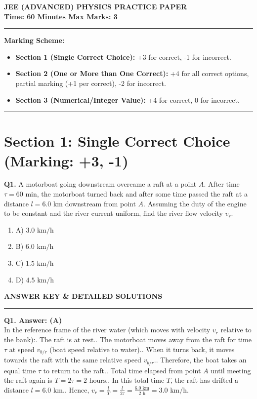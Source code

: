 \documentclass[11pt,a4paper]{article}
\begin{document}
\begin{center}
    {\LARGE \textbf{JEE (ADVANCED) PHYSICS PRACTICE PAPER}}\\[4pt]
    \textbf{Time: 60 Minutes \qquad Max Marks: 3}
    \rule{\textwidth}{1pt}
\end{center}

\vspace{0.2cm}
\noindent \textbf{Marking Scheme:}
\begin{itemize}[noitemsep]
    \item \textbf{Section 1 (Single Correct Choice):} +3 for correct, -1 for incorrect.
    \item \textbf{Section 2 (One or More than One Correct):} +4 for all correct options, partial marking (+1 per correct), -2 for incorrect.
    \item \textbf{Section 3 (Numerical/Integer Value):} +4 for correct, 0 for incorrect.
\end{itemize}
\rule{\textwidth}{0.5pt}

\vspace{0.4cm}
\section*{Section 1: Single Correct Choice (Marking: +3, -1)}

\textbf{Q1.} A motorboat going downstream overcame a raft at a point $A$. After time $\tau = 60\text{ min}$, the motorboat turned back and after some time passed the raft at a distance $l = 6.0\text{ km}$ downstream from point $A$. Assuming the duty of the engine to be constant and the river current uniform, find the river flow velocity $v_r$.


\begin{enumerate}[label=(\Alph*), itemsep=2pt]
  \item A) $3.0\text{ km/h}$
  \item B) $6.0\text{ km/h}$
  \item C) $1.5\text{ km/h}$
  \item D) $4.5\text{ km/h}$
\end{enumerate}


\newpage
\begin{center}
    {\Large \textbf{ANSWER KEY \& DETAILED SOLUTIONS}}
    \rule{\textwidth}{1pt}
\end{center}

\textbf{Q1. Answer: (A)}\\
In the reference frame of the river water (which moves with velocity $v_r$ relative to the bank):. The raft is at rest.. The motorboat moves away from the raft for time $\tau$ at speed $v_{b/r}$ (boat speed relative to water).. When it turns back, it moves towards the raft with the same relative speed $v_{b/r}$.. Therefore, the boat takes an equal time $\tau$ to return to the raft.. Total time elapsed from point $A$ until meeting the raft again is $T = 2\tau = 2\text{ hours}$.. In this total time $T$, the raft has drifted a distance $l = 6.0\text{ km}$.. Hence, $v_r = \frac{l}{T} = \frac{l}{2\tau} = \frac{6.0\text{ km}}{2\text{ h}} = 3.0\text{ km/h}$.
\vspace{0.3cm}
\end{document}
